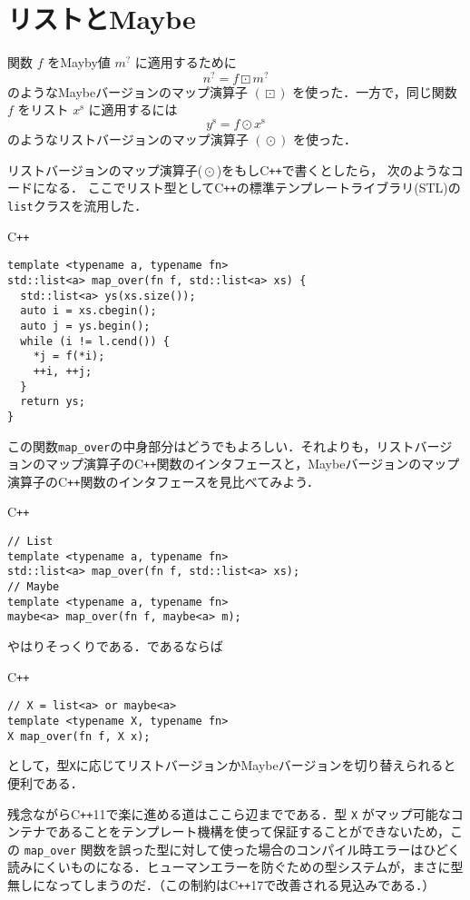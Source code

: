 \documentclass[a4paper,draft]{jsbook}
\newcommand{\programminglanguage}[1]{\textsf{#1}}
\newcommand{\cxx}{\programminglanguage{C}\texttt{++}}
\newcommand{\cxxeleven}{\cxx\programminglanguage{11}}
\newcommand{\cxxseventeen}{\cxx\programminglanguage{17}}
\newcommand{\code}[1]{\texttt{#1}}
\newenvironment{cxxcode}{\begin{itembox}[r]{\cxx}}{\end{itembox}}
\newcommand{\mList}[1]{{#1}^\mathrm{s}}
\newcommand{\mMaybe}[1]{{#1}^\text{?}}
\DeclareMathOperator{\mMapList}{\odot}
\DeclareMathOperator{\mMapMaybe}{\boxdot}
\begin{document}
\section{リストとMaybe}

関数 $f$ をMayby値 $\mMaybe{m}$ に適用するために
\begin{equation}
\mMaybe{n}=f\mMapMaybe\mMaybe{m}
\end{equation}
のようなMaybeバージョンのマップ演算子 $(\mMapMaybe)$ を使った．一方で，同じ関数 $f$ をリスト $\mList{x}$ に適用するには
\begin{equation}
\mList{y}=f\mMapList\mList{x}
\end{equation}
のようなリストバージョンのマップ演算子 $(\mMapList)$ を使った．

リストバージョンのマップ演算子($\mMapList$)をもし\cxx で書くとしたら，
次のようなコードになる．
ここでリスト型として\cxx の標準テンプレートライブラリ(STL)の
\code{list}クラスを流用した．
\begin{cxxcode}
\begin{verbatim}
template <typename a, typename fn>
std::list<a> map_over(fn f, std::list<a> xs) {
  std::list<a> ys(xs.size());
  auto i = xs.cbegin();
  auto j = ys.begin();
  while (i != l.cend()) {
    *j = f(*i);
    ++i, ++j;
  }
  return ys;
}
\end{verbatim}
\end{cxxcode}
この関数\code{map\_over}の中身部分はどうでもよろしい．それよりも，リストバージョンのマップ演算子の\cxx 関数のインタフェースと，Maybeバージョンのマップ演算子の\cxx 関数のインタフェースを見比べてみよう．
\begin{cxxcode}
\begin{verbatim}
// List
template <typename a, typename fn>
std::list<a> map_over(fn f, std::list<a> xs);
// Maybe
template <typename a, typename fn>
maybe<a> map_over(fn f, maybe<a> m);
\end{verbatim}
\end{cxxcode}
やはりそっくりである．であるならば
\begin{cxxcode}
\begin{verbatim}
// X = list<a> or maybe<a>
template <typename X, typename fn>
X map_over(fn f, X x);
\end{verbatim}
\end{cxxcode}
として，型\code{X}に応じてリストバージョンかMaybeバージョンを切り替えられると便利である．

残念ながら\cxxeleven で楽に進める道はここら辺までである．型 \code{X} がマップ可能なコンテナであることをテンプレート機構を使って保証することができないため，この \code{map\_over} 関数を誤った型に対して使った場合のコンパイル時エラーはひどく読みにくいものになる．ヒューマンエラーを防ぐための型システムが，まさに型無しになってしまうのだ．（この制約は\cxxseventeen で改善される見込みである．）
\end{document}
